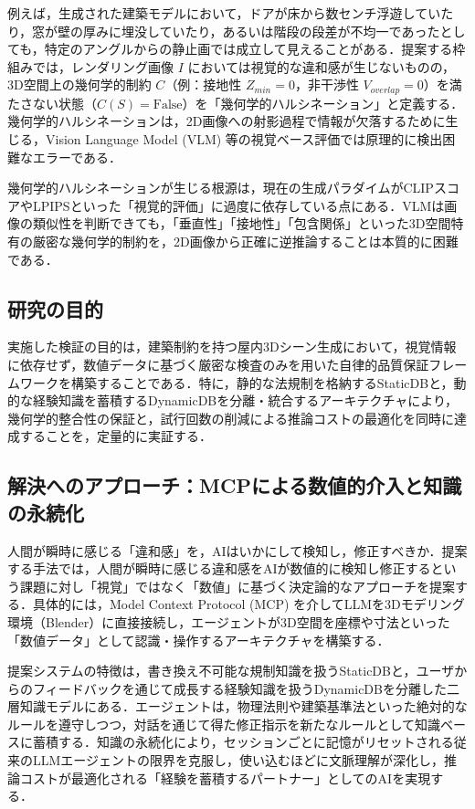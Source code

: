 \documentclass[dvipdfmx, a4paper, 9pt]{deimj}
\begin{document}
例えば，生成された建築モデルにおいて，ドアが床から数センチ浮遊していたり，窓が壁の厚みに埋没していたり，あるいは階段の段差が不均一であったとしても，特定のアングルからの静止画では成立して見えることがある．提案する枠組みでは，レンダリング画像 $I$ においては視覚的な違和感が生じないものの，3D空間上の幾何学的制約 $C$（例：接地性 $Z_{min}=0$，非干渉性 $V_{overlap}=0$）を満たさない状態（$C(S) = \text{False}$）を「幾何学的ハルシネーション」と定義する．幾何学的ハルシネーションは，2D画像への射影過程で情報が欠落するために生じる，Vision Language Model (VLM) 等の視覚ベース評価では原理的に検出困難なエラーである．

幾何学的ハルシネーションが生じる根源は，現在の生成パラダイムがCLIPスコア\cite{radford2021clip}やLPIPS\cite{zhang2018lpips}といった「視覚的評価」に過度に依存している点にある．VLMは画像の類似性を判断できても，「垂直性」「接地性」「包含関係」といった3D空間特有の厳密な幾何学的制約を，2D画像から正確に逆推論することは本質的に困難である．

\subsection{研究の目的}

実施した検証の目的は，建築制約を持つ屋内3Dシーン生成において，視覚情報に依存せず，数値データに基づく厳密な検査のみを用いた自律的品質保証フレームワークを構築することである．特に，静的な法規制を格納するStaticDBと，動的な経験知識を蓄積するDynamicDBを分離・統合するアーキテクチャにより，幾何学的整合性の保証と，試行回数の削減による推論コストの最適化を同時に達成することを，定量的に実証する．

\subsection{解決へのアプローチ：MCPによる数値的介入と知識の永続化}

人間が瞬時に感じる「違和感」を，AIはいかにして検知し，修正すべきか．提案する手法では，人間が瞬時に感じる違和感をAIが数値的に検知し修正するという課題に対し「視覚」ではなく「数値」に基づく決定論的なアプローチを提案する．具体的には，Model Context Protocol (MCP)\cite{anthropic2024mcp} を介してLLMを3Dモデリング環境（Blender）に直接接続し，エージェントが3D空間を座標や寸法といった「数値データ」として認識・操作するアーキテクチャを構築する．

提案システムの特徴は，書き換え不可能な規制知識を扱うStaticDBと，ユーザからのフィードバックを通じて成長する経験知識を扱うDynamicDBを分離した二層知識モデルにある．エージェントは，物理法則や建築基準法といった絶対的なルールを遵守しつつ，対話を通じて得た修正指示を新たなルールとして知識ベースに蓄積する．知識の永続化により，セッションごとに記憶がリセットされる従来のLLMエージェントの限界を克服し，使い込むほどに文脈理解が深化し，推論コストが最適化される「経験を蓄積するパートナー」としてのAIを実現する．
\end{document}
